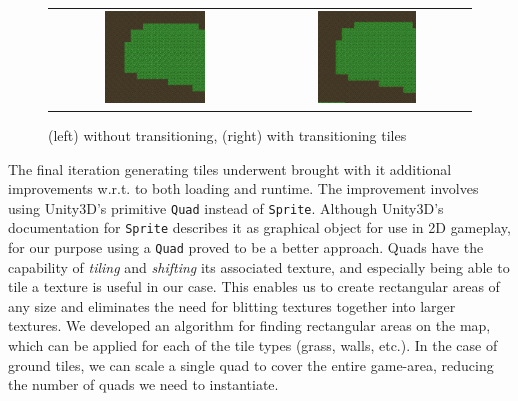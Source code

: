 \begin{figure}[H]
    \centering
    \begin{tabular}{cc}
        \includegraphics[width=0.5\textwidth]{figures/generating_levels/no_transition.png}
        &
        \includegraphics[width=0.5\textwidth]{figures/generating_levels/with_transition.png}
    \end{tabular}
    \caption{(left) without transitioning, (right) with transitioning tiles}\label{fig:transition_comparison}
\end{figure}

The final iteration generating tiles underwent brought with it additional
improvements w.r.t. to both loading and runtime. The improvement involves using
Unity3D's primitive \texttt{Quad} instead of \texttt{Sprite}. Although
Unity3D's documentation for \texttt{Sprite} describes it as graphical object
for use in 2D gameplay\cite{unitySprite}, for our purpose using a
\texttt{Quad} proved to be a better approach. Quads have the
capability of \textit{tiling} and \textit{shifting} its associated texture, and
especially being able to tile a texture is useful in our case. This enables us
to create rectangular areas of any size and eliminates the need for blitting
textures together into larger textures. We developed an algorithm for finding
rectangular areas on the map, which can be applied for each of the tile types
(grass, walls, etc.). In the case of ground tiles, we can scale a single quad
to cover the entire game-area, reducing the number of quads we need to
instantiate.

